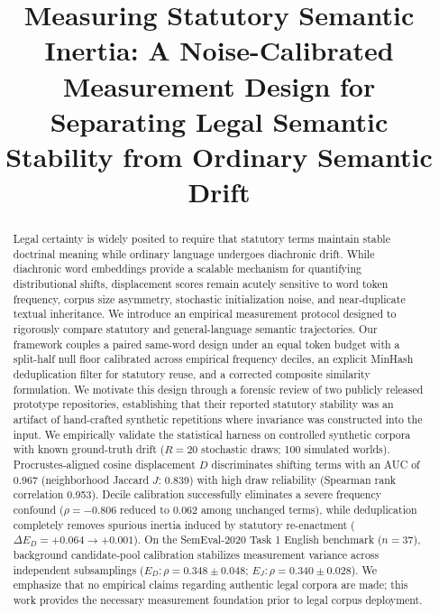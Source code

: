 \documentclass[conference]{IEEEtran}
\begin{document}
\title{Measuring Statutory Semantic Inertia: A Noise-Calibrated Measurement Design for Separating Legal Semantic Stability from Ordinary Semantic Drift}

\author{
\and
{}
}

\maketitle

\begin{abstract}
Legal certainty is widely posited to require that statutory terms maintain stable doctrinal meaning while ordinary language undergoes diachronic drift. While diachronic word embeddings provide a scalable mechanism for quantifying distributional shifts, displacement scores remain acutely sensitive to word token frequency, corpus size asymmetry, stochastic initialization noise, and near-duplicate textual inheritance. We introduce an empirical measurement protocol designed to rigorously compare statutory and general-language semantic trajectories. Our framework couples a paired same-word design under an equal token budget with a split-half null floor calibrated across empirical frequency deciles, an explicit MinHash deduplication filter for statutory reuse, and a corrected composite similarity formulation. We motivate this design through a forensic review of two publicly released prototype repositories, establishing that their reported statutory stability was an artifact of hand-crafted synthetic repetitions where invariance was constructed into the input. We empirically validate the statistical harness on controlled synthetic corpora with known ground-truth drift ($R=20$ stochastic draws; 100 simulated worlds). Procrustes-aligned cosine displacement $D$ discriminates shifting terms with an AUC of 0.967 (neighborhood Jaccard $J$: 0.839) with high draw reliability (Spearman rank correlation 0.953). Decile calibration successfully eliminates a severe frequency confound ($\rho = -0.806$ reduced to $0.062$ among unchanged terms), while deduplication completely removes spurious inertia induced by statutory re-enactment ($\Delta E_D = +0.064 \to +0.001$). On the SemEval-2020 Task 1 English benchmark ($n=37$), background candidate-pool calibration stabilizes measurement variance across independent subsamplings ($E_D: \rho = 0.348 \pm 0.048$; $E_J: \rho = 0.340 \pm 0.028$). We emphasize that no empirical claims regarding authentic legal corpora are made; this work provides the necessary measurement foundation prior to legal corpus deployment.
\end{abstract}
\end{document}
